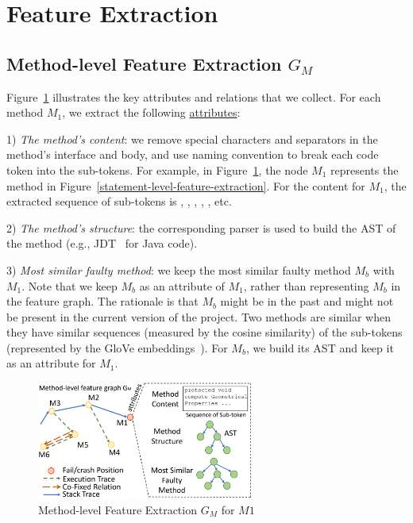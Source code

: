 \section{Feature Extraction}
\label{feature-extract:sec}




\subsection{Method-level Feature Extraction $G_M$}

Figure~\ref{method-level-feature-extraction} illustrates the key
attributes and relations that we collect. For each method $M_1$, we
extract the following \underline{attributes}:


1) {\em The method's content}: we remove special characters and
separators in the method's interface and body, and use naming
convention to break each code token into the sub-tokens. For example,
in Figure~\ref{method-level-feature-extraction}, the node $M_1$
represents the method  in
Figure~\ref{statement-level-feature-extraction}. For the content for
$M_1$, the extracted sequence of sub-tokens is ,
, , , ,
etc.

2) {\em The method's structure}: the corresponding parser is used to
build the AST of the method (e.g., JDT~\cite{JDT} for Java code).


3) {\em Most similar faulty method}: we keep the most
similar faulty method $M_b$ with $M_1$. Note that we keep $M_b$ as an
attribute of $M_1$, rather than representing $M_b$ in the feature
graph. The rationale is that $M_b$ might be in the past and might not
be present in the current version of the project. Two methods are
similar when they have similar sequences (measured by the cosine
similarity) of the sub-tokens (represented by the GloVe
embeddings~\cite{glove2014}).  For $M_b$, we build its AST and
keep it as an attribute for $M_1$.

  \begin{figure}[t]
	\centering
	\includegraphics[width=2.8in]{graphs/step-1-method-2.png}
        \vspace{-6pt}
        \caption{Method-level Feature Extraction $G_M$ for $M1$}
	\label{method-level-feature-extraction}
\end{figure}

